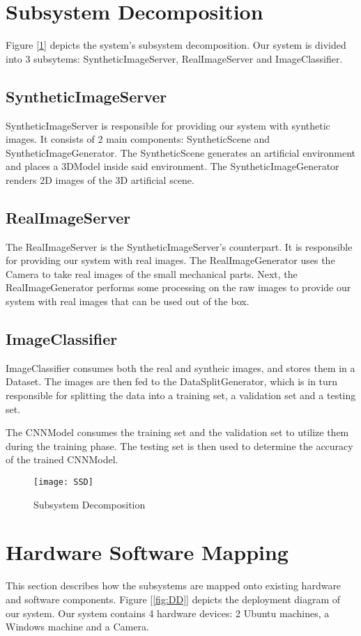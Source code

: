 \section{Subsystem Decomposition}

Figure [\ref{fig:SSD}] depicts the system's subsystem decomposition. Our system is divided into 3 subsytems: SyntheticImageServer, RealImageServer and ImageClassifier.

\subsection{SyntheticImageServer}
SyntheticImageServer is responsible for providing our system with synthetic images. It consists of 2 main components: SyntheticScene and SyntheticImageGenerator. The SyntheticScene generates an artificial environment and places a 3DModel inside said environment. The SyntheticImageGenerator renders 2D images of the 3D artificial scene.

\subsection{RealImageServer}
The RealImageServer is the SyntheticImageServer's counterpart. It is responsible for providing our system with real images. The RealImageGenerator uses the Camera to take real images of the small mechanical parts. Next, the RealImageGenerator performs some processing on the raw images to provide our system with real images that can be used out of the box.

\subsection{ImageClassifier}
ImageClassifier consumes both the real and syntheic images, and stores them in a Dataset. The images are then fed to the DataSplitGenerator, which is in turn responsible for splitting the data into a training set, a validation set and a testing set.

The CNNModel consumes the training set and the validation set to utilize them during the training phase. The testing set is then used to determine the accuracy of the trained CNNModel.

\begin{figure}[H]
\centering
  \texttt{[image: SSD]}
\caption{Subsystem Decomposition}
\label{fig:SSD}
\end{figure}

\section{Hardware Software Mapping}
This section describes how the subsystems are mapped onto existing hardware and software components. Figure [\ref{fig:DD}] depicts the deployment diagram of our system. Our system contains 4 hardware devices: 2 Ubuntu machines, a Windows machine and a Camera.

